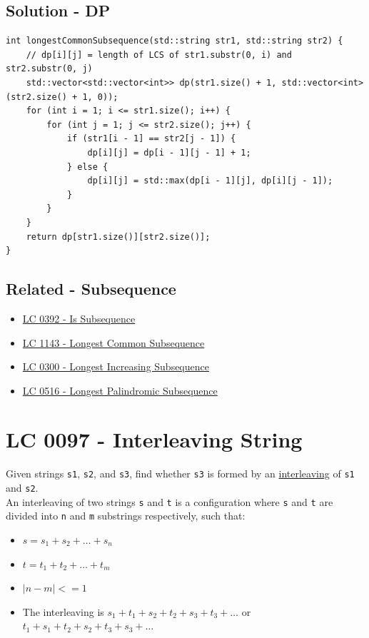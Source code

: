 \subsection*{Solution - DP}\label{solution:lc1143_dp}
\begin{lstlisting}
int longestCommonSubsequence(std::string str1, std::string str2) {
	// dp[i][j] = length of LCS of str1.substr(0, i) and str2.substr(0, j)
	std::vector<std::vector<int>> dp(str1.size() + 1, std::vector<int>(str2.size() + 1, 0));
	for (int i = 1; i <= str1.size(); i++) {
		for (int j = 1; j <= str2.size(); j++) {
			if (str1[i - 1] == str2[j - 1]) {
				dp[i][j] = dp[i - 1][j - 1] + 1;
			} else {
				dp[i][j] = std::max(dp[i - 1][j], dp[i][j - 1]);
			}
		}
	}
	return dp[str1.size()][str2.size()];
}
\end{lstlisting}

\subsection*{Related - Subsequence}
\begin{itemize}
	\item \hyperref[lc0392]{LC 0392 - Is Subsequence}
	\item \hyperref[lc1143]{LC 1143 - Longest Common Subsequence}
	\item \hyperref[lc0300]{LC 0300 - Longest Increasing Subsequence}
	\item \hyperref[lc0516]{LC 0516 - Longest Palindromic Subsequence}
\end{itemize}

\section{LC 0097 - Interleaving String}\label{lc0097}
Given strings {\colorbox{CodeBackground}{\lstinline|s1|}}, {\colorbox{CodeBackground}{\lstinline|s2|}}, and {\colorbox{CodeBackground}{\lstinline|s3|}}, find whether {\colorbox{CodeBackground}{\lstinline|s3|}} is formed by an \ul{interleaving} of {\colorbox{CodeBackground}{\lstinline|s1|}} and {\colorbox{CodeBackground}{\lstinline|s2|}}.\\

An interleaving of two strings {\colorbox{CodeBackground}{\lstinline|s|}} and {\colorbox{CodeBackground}{\lstinline|t|}} is a configuration where {\colorbox{CodeBackground}{\lstinline|s|}} and {\colorbox{CodeBackground}{\lstinline|t|}} are divided into {\colorbox{CodeBackground}{\lstinline|n|}} and {\colorbox{CodeBackground}{\lstinline|m|}} substrings respectively, such that:
\begin{itemize}
	\item $s = s_1 + s_2 + \dots + s_n$
	\item $t = t_1 + t_2 + \dots + t_m$
	\item $|n - m| <= 1$
	\item The interleaving is $s_1 + t_1 + s_2 + t_2 + s_3 + t_3 + \dots$ or $t_1 + s_1 + t_2 + s_2 + t_3 + s_3 + \dots$
\end{itemize}


